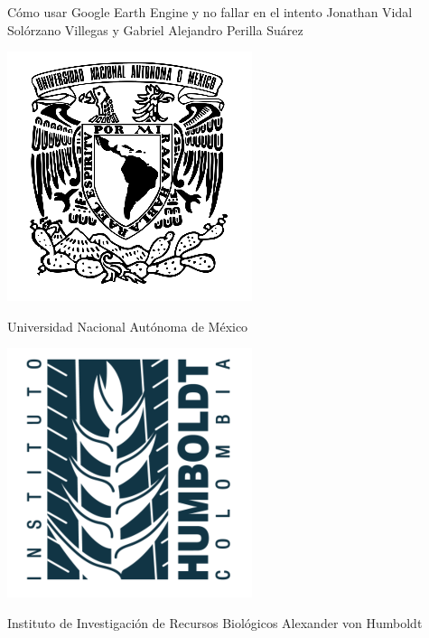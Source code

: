 \documentclass[
  12pt,
  letterpaper,
  twoside]{book}
\newenvironment{Figure}
  {\par\medskip\noindent\minipage{\linewidth}}
  {\endminipage\par\medskip}
\begin{document}
\vspace*{\fill}
\begin{center}
\LARGE{Cómo usar Google Earth Engine y no fallar en el intento}
\linebreak
\linebreak
\large{Jonathan Vidal Solórzano Villegas y Gabriel Alejandro Perilla Suárez}
\end{center}
\vspace{15mm}
\setlength{\columnsep}{40pt}
\begin{multicols}{2}
    \begin{Figure}
    \centering
    \includegraphics[width=0.7\linewidth]{Img/unam}
    \end{Figure}
    \centering Universidad Nacional Autónoma de México
    \begin{Figure}
    \centering
    \includegraphics[width=0.7\linewidth]{Img/humb}
    \end{Figure}
    \centering Instituto de Investigación de Recursos Biológicos Alexander von Humboldt 
\end{multicols}
\vspace*{\fill}
\end{document}
